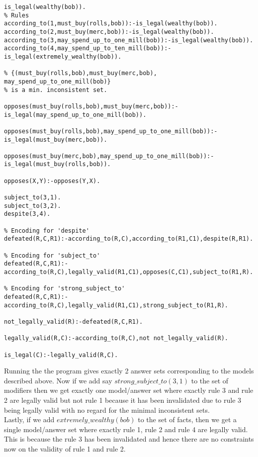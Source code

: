 \begin{verbatim}
is_legal(wealthy(bob)).
% Rules
according_to(1,must_buy(rolls,bob)):-is_legal(wealthy(bob)).
according_to(2,must_buy(merc,bob)):-is_legal(wealthy(bob)).
according_to(3,may_spend_up_to_one_mill(bob)):-is_legal(wealthy(bob)).
according_to(4,may_spend_up_to_ten_mill(bob)):-is_legal(extremely_wealthy(bob)).

% {(must_buy(rolls,bob),must_buy(merc,bob), may_spend_up_to_one_mill(bob)} 
% is a min. inconsistent set.

opposes(must_buy(rolls,bob),must_buy(merc,bob)):-is_legal(may_spend_up_to_one_mill(bob)).

opposes(must_buy(rolls,bob),may_spend_up_to_one_mill(bob)):-is_legal(must_buy(merc,bob)).

opposes(must_buy(merc,bob),may_spend_up_to_one_mill(bob)):-is_legal(must_buy(rolls,bob)).

opposes(X,Y):-opposes(Y,X).

subject_to(3,1).
subject_to(3,2).
despite(3,4).

% Encoding for 'despite'
defeated(R,C,R1):-according_to(R,C),according_to(R1,C1),despite(R,R1).

% Encoding for 'subject_to'
defeated(R,C,R1):-according_to(R,C),legally_valid(R1,C1),opposes(C,C1),subject_to(R1,R).

% Encoding for 'strong_subject_to'
defeated(R,C,R1):-according_to(R,C),legally_valid(R1,C1),strong_subject_to(R1,R).

not_legally_valid(R):-defeated(R,C,R1).

legally_valid(R,C):-according_to(R,C),not not_legally_valid(R).

is_legal(C):-legally_valid(R,C).

\end{verbatim}
Running the the program gives exactly 2 answer sets corresponding to the models described above. Now if we add say $strong\_subject\_to(3,1)$ to the set of modifiers then we get exactly one model/answer set where exactly rule 3 and rule 2 are legally valid but not rule 1 because it has been invalidated due to rule 3 being legally valid with no regard for the minimal inconsistent sets.\\
\newline
Lastly, if we add $extremely\_wealthy(bob)$ to the set of facts, then we get a single model/answer set where exactly rule 1, rule 2 and rule 4 are legally valid. This is because the rule 3 has been invalidated and hence there are no constraints now on the validity of rule 1 and rule 2.\\
